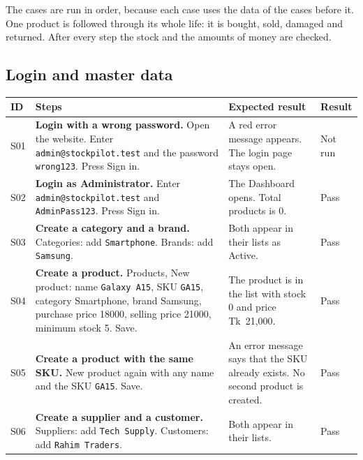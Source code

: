 \documentclass[11pt,a4paper]{article}
\newcommand{\code}[1]{\texttt{#1}}
\begin{document}
The cases are run in order, because each case uses the data of the cases before it. One product is followed through its whole life: it is bought, sold, damaged and returned. After every step the stock and the amounts of money are checked.

\subsection{Login and master data}
\begin{longtable}{@{}P{0.75cm}P{6.0cm}P{5.3cm}P{1.3cm}@{}}
\toprule
\textbf{ID} & \textbf{Steps} & \textbf{Expected result} & \textbf{Result} \\
\midrule
\endhead
S01 & \textbf{Login with a wrong password.} Open the website. Enter \code{admin@stockpilot.test} and the password \code{wrong123}. Press Sign in. & A red error message appears. The login page stays open. & Not run \\\addlinespace
S02 & \textbf{Login as Administrator.} Enter \code{admin@stockpilot.test} and \code{AdminPass123}. Press Sign in. & The Dashboard opens. Total products is 0. & Pass \\\addlinespace
S03 & \textbf{Create a category and a brand.} Categories: add \code{Smartphone}. Brands: add \code{Samsung}. & Both appear in their lists as Active. & Pass \\\addlinespace
S04 & \textbf{Create a product.} Products, New product: name \code{Galaxy A15}, SKU \code{GA15}, category Smartphone, brand Samsung, purchase price 18000, selling price 21000, minimum stock 5. Save. & The product is in the list with stock 0 and price Tk~21,000. & Pass \\\addlinespace
S05 & \textbf{Create a product with the same SKU.} New product again with any name and the SKU \code{GA15}. Save. & An error message says that the SKU already exists. No second product is created. & Pass \\\addlinespace
S06 & \textbf{Create a supplier and a customer.} Suppliers: add \code{Tech Supply}. Customers: add \code{Rahim Traders}. & Both appear in their lists. & Pass \\*
\bottomrule
\end{longtable}

\end{document}
